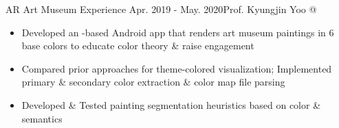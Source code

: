 {    \cveventSameLine{}%
        {AR Art Museum Experience}%
        {Apr. 2019 - May. 2020}{Prof. Kyungjin Yoo @ }%
    \begin{itemize}%
        \item Developed an -based Android app
        that renders art museum paintings in 6 base colors to educate color theory \& raise engagement%
        \item Compared prior approaches for theme-colored visualization; Implemented primary \& secondary color extraction \& color map file parsing%
        \item Developed \& Tested painting segmentation heuristics based on color \& semantics%
    \end{itemize}%
    \dividerSmall
}%
%
%